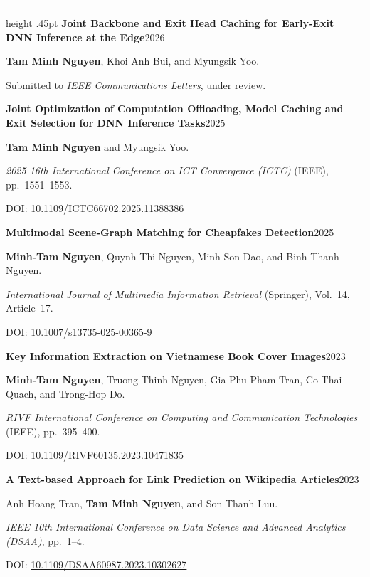 \documentclass[11pt,a4paper]{article}
\newcommand{\secname}[1]{\vspace{12pt}\Needspace{4\baselineskip}{\normalsize\bfseries\MakeUppercase{#1}}\par\vspace{2pt}\hrule height .45pt\vspace{5pt}}
\begin{document}
\secname{Selected Publications}
\textbf{Joint Backbone and Exit Head Caching for Early-Exit DNN Inference at the Edge}\hfill 2026\par
\textbf{Tam Minh Nguyen}, Khoi Anh Bui, and Myungsik Yoo.\par
Submitted to \textit{IEEE Communications Letters}, under review.\par
\vspace{5pt}
\textbf{Joint Optimization of Computation Offloading, Model Caching and Exit Selection for DNN Inference Tasks}\hfill 2025\par
\textbf{Tam Minh Nguyen} and Myungsik Yoo.\par
\textit{2025 16th International Conference on ICT Convergence (ICTC)} (IEEE), pp.~1551--1553.\par
DOI: \href{https://doi.org/10.1109/ICTC66702.2025.11388386}{10.1109/ICTC66702.2025.11388386}\par
\vspace{5pt}
\textbf{Multimodal Scene-Graph Matching for Cheapfakes Detection}\hfill 2025\par
\textbf{Minh-Tam Nguyen}, Quynh-Thi Nguyen, Minh-Son Dao, and Binh-Thanh Nguyen.\par
\textit{International Journal of Multimedia Information Retrieval} (Springer), Vol.~14, Article~17.\par
DOI: \href{https://doi.org/10.1007/s13735-025-00365-9}{10.1007/s13735-025-00365-9}\par
\vspace{5pt}
\textbf{Key Information Extraction on Vietnamese Book Cover Images}\hfill 2023\par
\textbf{Minh-Tam Nguyen}, Truong-Thinh Nguyen, Gia-Phu Pham Tran, Co-Thai Quach, and Trong-Hop Do.\par
\textit{RIVF International Conference on Computing and Communication Technologies} (IEEE), pp.~395--400.\par
DOI: \href{https://doi.org/10.1109/RIVF60135.2023.10471835}{10.1109/RIVF60135.2023.10471835}\par
\vspace{5pt}
\textbf{A Text-based Approach for Link Prediction on Wikipedia Articles}\hfill 2023\par
Anh Hoang Tran, \textbf{Tam Minh Nguyen}, and Son Thanh Luu.\par
\textit{IEEE 10th International Conference on Data Science and Advanced Analytics (DSAA)}, pp.~1--4.\par
DOI: \href{https://doi.org/10.1109/DSAA60987.2023.10302627}{10.1109/DSAA60987.2023.10302627}\par
\end{document}
